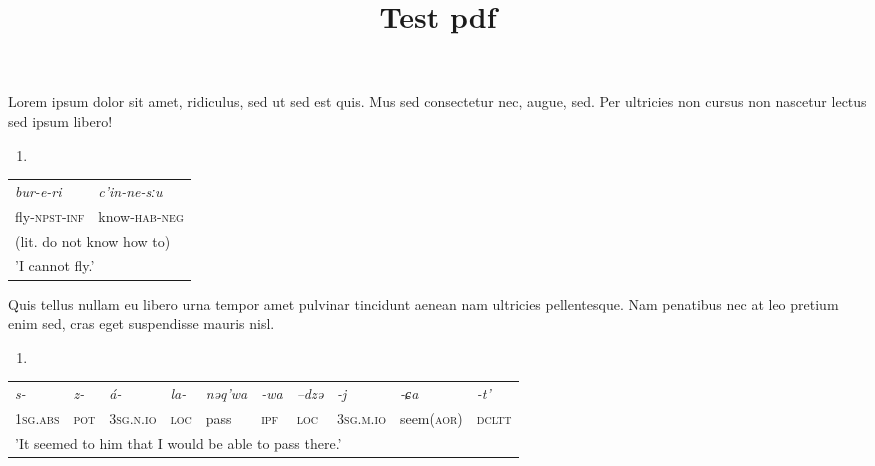 \documentclass[
]{article}
\title{Test pdf}
\author{}
\date{\vspace{-2.5em}}
\providecommand{\tightlist}{%
  \setlength{\itemsep}{0pt}\setlength{\parskip}{0pt}}
\begin{document}
\maketitle

Lorem ipsum dolor sit amet, ridiculus, sed ut sed est quis. Mus sed
consectetur nec, augue, sed. Per ultricies non cursus non nascetur
lectus sed ipsum libero!

\begin{enumerate}
\def\labelenumi{(\arabic{enumi})}
\tightlist
\item
\end{enumerate}

\begin{tabular}[t]{ll}

\textit{bur-e-ri} & \textit{c'in-ne-sːu}\\

fly-\textsc{npst}-\textsc{inf} & know-\textsc{hab}-\textsc{neg}\\

\multicolumn{2}{l}{\rule{0pt}{1em}(lit. do not know how to)}\\
\multicolumn{2}{l}{\rule{0pt}{1em}'I cannot fly.'}\\
\end{tabular}

Quis tellus nullam eu libero urna tempor amet pulvinar tincidunt aenean
nam ultricies pellentesque. Nam penatibus nec at leo pretium enim sed,
cras eget suspendisse mauris nisl.

\begin{enumerate}
\def\labelenumi{(\arabic{enumi})}
\setcounter{enumi}{1}
\tightlist
\item
\end{enumerate}

\begin{tabular}[t]{llllllllll}

\textit{s-} & \textit{z-} & \textit{á-} & \textit{la-} & \textit{nəq'wa} & \textit{-wa} & \textit{–dzə} & \textit{-j} & \textit{-ɕa} & \textit{-t'}\\

\textsc{1sg}.\textsc{abs} & \textsc{pot} & \textsc{3sg}.\textsc{n}.\textsc{io} & \textsc{loc} & pass & \textsc{ipf} & \textsc{loc} & \textsc{3sg}.\textsc{m}.\textsc{io} & seem(\textsc{aor}) & \textsc{dcltt}\\

\multicolumn{10}{l}{\rule{0pt}{1em}'It seemed to him that I would be able to pass there.'}\\
\end{tabular}
\end{document}

